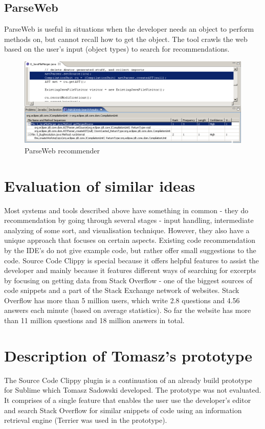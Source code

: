 \documentclass{l4proj}
\begin{document}
\subsection{ParseWeb}
ParseWeb is useful in situations when the developer needs an object to perform methods on, but cannot recall how to get the object. The tool crawls the web based on the user's input (object types) to search for recommendations.

\begin{figure}[H]
\includegraphics[scale=0.5]{parseweb}
\centering
\caption{ParseWeb recommender}\label{parseweb}
\label{fig:parseweb}
\end{figure}

\section{Evaluation of similar ideas}
Most systems and tools described above have something in common - they do recommendation by going through several stages - input handling, intermediate analyzing of some sort, and visualisation technique. However, they also have a unique approach that focuses on certain aspects. Existing code recommendation by the IDE's do not give example code, but rather offer small suggestions to the code. Source Code Clippy is special because it offers helpful features to assist the developer and mainly because it features different ways of searching for excerpts by focusing on getting data from Stack Overflow - one of the biggest sources of code snippets and a part of the Stack Exchange network of websites. Stack Overflow has more than 5 million users, which write 2.8 questions and 4.56 answers each minute (based on average statistics). So far the website has more than 11 million questions and 18 million answers in total.

\section{Description of Tomasz's prototype}
The Source Code Clippy plugin is a continuation of an already build prototype for Sublime which Tomasz Sadowski developed. The prototype was not evaluated. It comprises of a single feature that enables the user use the developer's editor and search Stack Overflow for similar snippets of code using an information retrieval engine (Terrier was used in the prototype). 
\end{document}
